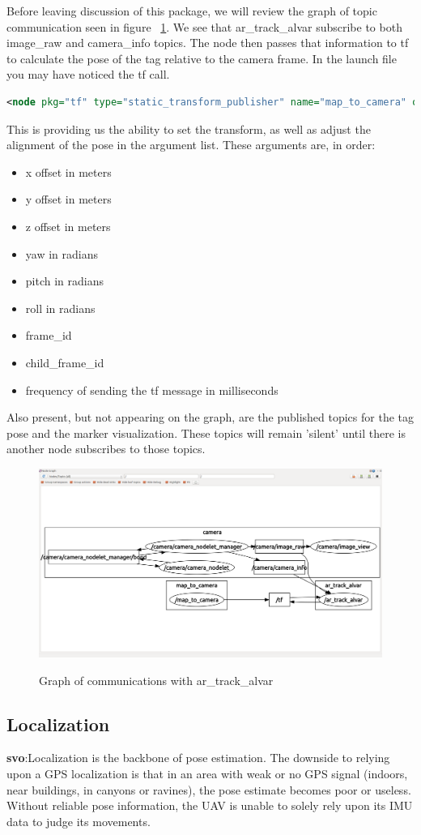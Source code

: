\begin{itemize}
Before leaving discussion of this package, we will review the graph of topic communication seen in figure ~\ref{tracker_graph}. We see that ar\_track\_alvar subscribe to both image\_raw and camera\_info topics. The node then passes that information to tf to calculate the pose of the tag relative to the camera frame. In the launch file you may have noticed the tf call.
\begin{lstlisting}[language=xml]
	<node pkg="tf" type="static_transform_publisher" name="map_to_camera" output="screen" args="0 0 0 0 0 0 world camera 10" />
\end{lstlisting}
This is providing us the ability to set the transform, as well as adjust the alignment of the pose in the argument list. These arguments are, in order:
\begin{itemize}
\item x offset in meters
\item y offset in meters
\item z offset in meters
\item yaw in radians
\item pitch in radians
\item roll in radians
\item frame\_id
\item child\_frame\_id
\item frequency of sending the tf message in milliseconds
\end{itemize}
Also present, but not appearing on the graph, are the published topics for the tag pose and the marker visualization. These topics will remain 'silent' until there is another node subscribes to those topics. 
\begin{figure}[h]
\caption{Graph of communications with ar\_track\_alvar}
\centering
\includegraphics[width=.75\textwidth]{images/tracker_graph}
\label{tracker_graph}
\end{figure} 
\end{itemize}

\subsection{Localization}
\noindent \textbf{svo}:Localization is the backbone of pose estimation. The downside to relying upon a GPS localization is that in an area with weak or no GPS signal (indoors, near buildings, in canyons or ravines), the pose estimate becomes poor or useless. Without reliable pose information, the UAV is unable to solely rely upon its IMU data to judge its movements.\\

